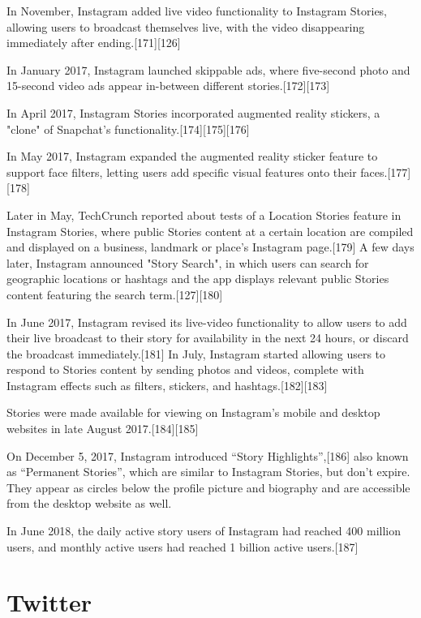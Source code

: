 \documentclass[12pt]{article}
\begin{document}
In November, Instagram added live video functionality to Instagram Stories, allowing users to broadcast themselves live, with the video disappearing immediately after ending.[171][126]

In January 2017, Instagram launched skippable ads, where five-second photo and 15-second video ads appear in-between different stories.[172][173]

In April 2017, Instagram Stories incorporated augmented reality stickers, a "clone" of Snapchat's functionality.[174][175][176]

In May 2017, Instagram expanded the augmented reality sticker feature to support face filters, letting users add specific visual features onto their faces.[177][178]

Later in May, TechCrunch reported about tests of a Location Stories feature in Instagram Stories, where public Stories content at a certain location are compiled and displayed on a business, landmark or place's Instagram page.[179] A few days later, Instagram announced "Story Search", in which users can search for geographic locations or hashtags and the app displays relevant public Stories content featuring the search term.[127][180]

In June 2017, Instagram revised its live-video functionality to allow users to add their live broadcast to their story for availability in the next 24 hours, or discard the broadcast immediately.[181] In July, Instagram started allowing users to respond to Stories content by sending photos and videos, complete with Instagram effects such as filters, stickers, and hashtags.[182][183]

Stories were made available for viewing on Instagram's mobile and desktop websites in late August 2017.[184][185]

On December 5, 2017, Instagram introduced “Story Highlights”,[186] also known as “Permanent Stories”, which are similar to Instagram Stories, but don't expire. They appear as circles below the profile picture and biography and are accessible from the desktop website as well.

In June 2018, the daily active story users of Instagram had reached 400 million users, and monthly active users had reached 1 billion active users.[187] 



\newpage

\section{Twitter}
\end{document}
